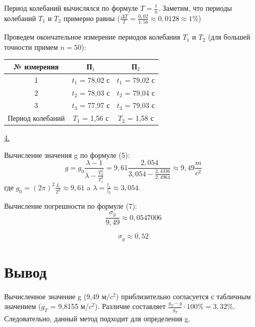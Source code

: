\documentclass{article}
\begin{document}
\noindent
Период колебаний вычислялся по формуле $T=\frac{t}{n}$. Заметим, что периоды колебаний $T_1$ и $T_2$ примерно равны ($\frac{\Delta T}{T} = \frac{0,02}{1,56} \approx 0,0128 \approx 1\%$)

\noindent
Проведем окончательное измерение периодов колебания $T_1$ и $T_2$ (для большей точности примем $n=50$):

\begin{table}[th!]
    \centering
    \begin{tabular}{|c|c|c|}
    \hline
         № измерения & П$_1$ & П$_2$\\
    
    \hline
        1  & $t_1$ = 78,02 с & $t_1$ = 79,02 с\\
        2  & $t_2$ = 78,03 с & $t_2$ = 79,04 с\\
        3  & $t_3$ = 77,97 с & $t_3$ = 79,03 с\\
    \hline
        Период колебаний  & $T_1$ = 1,56 с & $T_2$ = 1,58 с\\
    \hline
    \end{tabular}
    \label{tab:my_label}
\end{table}

\noindent
\underline{4.}

\noindent
Вычисление значения g по формуле (5):
$$g = g_0\frac{\lambda -1}{\lambda -\frac{T_2^2}{T_1^2}} = 9,61\frac{2,054}{3,054 - \frac{2,4336}{2,4964}} \approx 9,49 \frac{m}{c^2}$$
где $g_0 = (2\pi)^2\frac{L}{T^2} \approx 9,61 $ a $\lambda = \frac{l_1}{l_2} \approx 3,054$.

\noindent
Вычисление погрешности по формуле (7):
$$ \frac{\sigma_g}{9,49}\approx 0,0547006 $$

$$\sigma_g\approx 0,52$$


\section*{Вывод}

\noindent
Вычисленное значение g (9,49 м/$c^2$) приблизительно согласуется с табличным значением ($g_T$ = 9,8155 м/$c^2$). Различие составляет $\frac{g_T - g}{g_T}\cdot 100\% = 3,32\%$. Следовательно, данный метод подходит для определения g.
\end{document}
